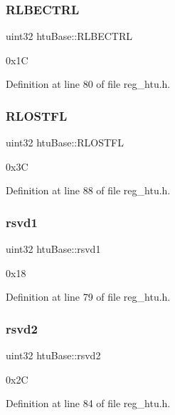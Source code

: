 \subsubsection{\texorpdfstring{R\+L\+B\+E\+C\+T\+RL}{RLBECTRL}}
{\footnotesize\ttfamily uint32 htu\+Base\+::\+R\+L\+B\+E\+C\+T\+RL}

0x1C 

Definition at line 80 of file reg\+\_\+htu.\+h.

\mbox{\label{structhtuBase_a627d36c9e86c593bf015eabc3dfe28db}} 
\subsubsection{\texorpdfstring{R\+L\+O\+S\+T\+FL}{RLOSTFL}}
{\footnotesize\ttfamily uint32 htu\+Base\+::\+R\+L\+O\+S\+T\+FL}

0x3C 

Definition at line 88 of file reg\+\_\+htu.\+h.

\mbox{\label{structhtuBase_af98febad161a62a137c4538ff0af83c3}} 
\subsubsection{\texorpdfstring{rsvd1}{rsvd1}}
{\footnotesize\ttfamily uint32 htu\+Base\+::rsvd1}

0x18 

Definition at line 79 of file reg\+\_\+htu.\+h.

\mbox{\label{structhtuBase_a9757b6c8fd40c0d4d0d42954d0632bf2}} 
\subsubsection{\texorpdfstring{rsvd2}{rsvd2}}
{\footnotesize\ttfamily uint32 htu\+Base\+::rsvd2}

0x2C 

Definition at line 84 of file reg\+\_\+htu.\+h.

\mbox{\label{structhtuBase_aac3576410753bf5543fe8ab407041cb4}} 
